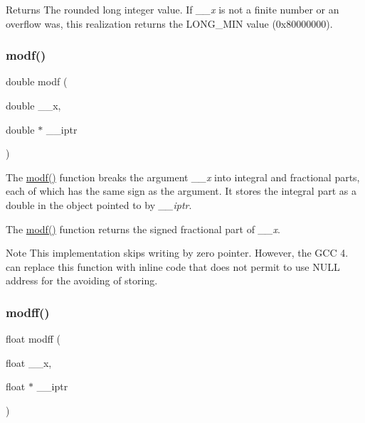 \begin{DoxyReturn}{Returns}
The rounded long integer value. If {\itshape \+\_\+\+\_\+x} is not a finite number or an overflow was, this realization returns the {\ttfamily L\+O\+N\+G\+\_\+\+M\+IN} value (0x80000000). 
\end{DoxyReturn}
\mbox{\label{group__avr__math_ga85861fee92c0904e9bb7a9875ee77579}} 
\subsubsection{\texorpdfstring{modf()}{modf()}}
{\footnotesize\ttfamily double modf (\begin{DoxyParamCaption}\item[{double}]{\+\_\+\+\_\+x,  }\item[{double $\ast$}]{\+\_\+\+\_\+iptr }\end{DoxyParamCaption})}

The \hyperlink{group__avr__math_ga85861fee92c0904e9bb7a9875ee77579}{modf()} function breaks the argument {\itshape \+\_\+\+\_\+x} into integral and fractional parts, each of which has the same sign as the argument. It stores the integral part as a double in the object pointed to by {\itshape \+\_\+\+\_\+iptr}.

The \hyperlink{group__avr__math_ga85861fee92c0904e9bb7a9875ee77579}{modf()} function returns the signed fractional part of {\itshape \+\_\+\+\_\+x}.

\begin{DoxyNote}{Note}
This implementation skips writing by zero pointer. However, the G\+CC 4. can replace this function with inline code that does not permit to use N\+U\+LL address for the avoiding of storing. 
\end{DoxyNote}
\mbox{\label{group__avr__math_gad180f98cb1dac86425c2f4df7faf2a15}} 
\subsubsection{\texorpdfstring{modff()}{modff()}}
{\footnotesize\ttfamily float modff (\begin{DoxyParamCaption}\item[{float}]{\+\_\+\+\_\+x,  }\item[{float $\ast$}]{\+\_\+\+\_\+iptr }\end{DoxyParamCaption})}

